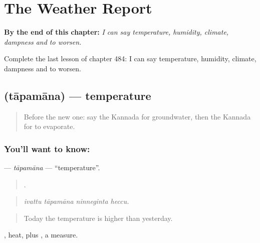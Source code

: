 
\chapter{The Weather Report}
\label{ch:ka-the-weather-report}

\begin{chapteropening}
\textbf{By the end of this chapter:} \emph{I can say temperature, humidity, climate, dampness and to worsen.}

Complete the last lesson of chapter 484: I can say temperature, humidity, climate, dampness and to worsen.
\end{chapteropening}

\section[\texorpdfstring{\kn{ತಾಪಮಾನ} (tāpamāna)}{ತಾಪಮಾನ (tāpamāna)}]{ (tāpamāna) — temperature}

\label{lesson:KA-C484-tapamana}



\begin{quote}
Before the new one: say the Kannada for groundwater, then the Kannada for to evaporate.
\end{quote}

\subsection*{You'll want to know: }
\textbf{} — \emph{tāpamāna} — \textquotedblleft{}temperature\textquotedblright{}.

\begin{quote}
   .
\end{quote}

\begin{quote}
\emph{ivattu tāpamāna ninneginta heccu.}
\end{quote}

\begin{quote}
Today the temperature is higher than yesterday.
\end{quote}

, heat, plus , a measure.

